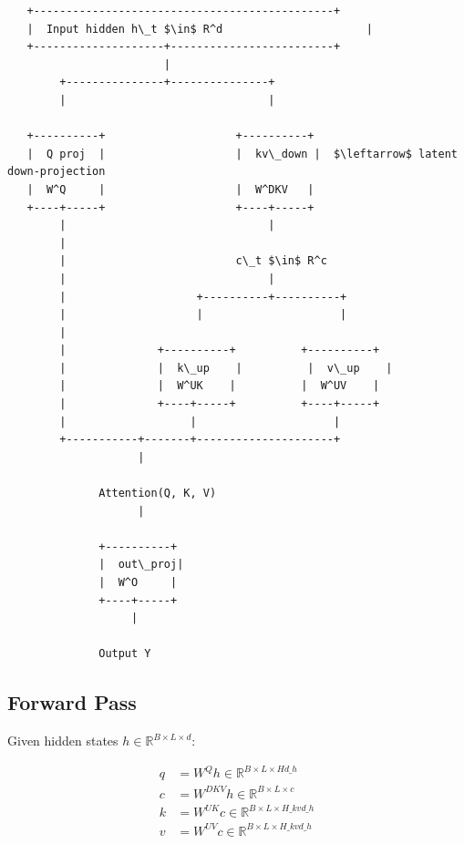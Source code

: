 \begin{lstlisting}
   +----------------------------------------------+
   |  Input hidden h\_t $\in$ R^d                      |
   +--------------------+-------------------------+
                        |
        +---------------+---------------+
        |                               |
                                         
   +----------+                    +----------+
   |  Q proj  |                    |  kv\_down |  $\leftarrow$ latent down-projection
   |  W^Q     |                    |  W^DKV   |
   +----+-----+                    +----+-----+
        |                               |
        |                                
        |                          c\_t $\in$ R^c
        |                               |
        |                    +----------+----------+
        |                    |                     |
        |                                           
        |              +----------+          +----------+
        |              |  k\_up    |          |  v\_up    |
        |              |  W^UK    |          |  W^UV    |
        |              +----+-----+          +----+-----+
        |                   |                     |
        +-----------+-------+---------------------+
                    |
                     
              Attention(Q, K, V)
                    |
                     
              +----------+
              |  out\_proj|
              |  W^O     |
              +----+-----+
                   |
                    
              Output Y
\end{lstlisting}

\subsection{Forward Pass}

Given hidden states $h \in \mathbb{R}^{B \times L \times d}$:

\[
\begin{aligned}
q &= W^Q h \in \mathbb{R}^{B \times L \times H d\_h} \\
c &= W^{DKV} h \in \mathbb{R}^{B \times L \times c} \\
k &= W^{UK} c \in \mathbb{R}^{B \times L \times H\_{kv} d\_h} \\
v &= W^{UV} c \in \mathbb{R}^{B \times L \times H\_{kv} d\_h}
\end{aligned}
\tag{4.1}
\]

